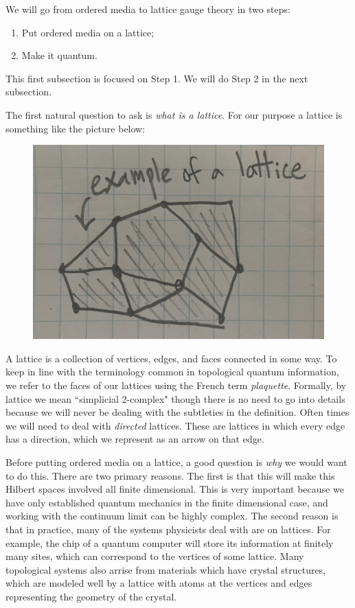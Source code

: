 \documentclass{article}
\theoremstyle{definition}
\numberwithin{figure}{section}
\begin{document}
We will go from ordered media to lattice gauge theory in two steps:

\begin{enumerate}[Step 1:]
\item Put ordered media on a lattice;
\item Make it quantum.
\end{enumerate}

This first subsection is focused on Step 1. We will do Step 2 in the next subsection.

The first natural question to ask is \textit{what is a lattice}. For our purpose a lattice is something like the picture below:

\begin{figure}[h]
\begin{center}
\includegraphics[scale=.04]{lattice-example}
\end{center}
\end{figure}

A lattice is a collection of vertices, edges, and faces connected in some way. To keep in line with the terminology common in topological quantum information, we refer to the faces of our lattices using the French term \textit{plaquette}. Formally, by lattice we mean ``simplicial 2-complex" though there is no need to go into details because we will never be dealing with the subtleties in the definition. Often times we will need to deal with \textit{directed} lattices. These are lattices in which every edge has a direction, which we represent as an arrow on that edge.

Before putting ordered media on a lattice, a good question is \textit{why} we would want to do this. There are two primary reasons. The first is that this will make this Hilbert spaces involved all finite dimensional. This is very important because we have only established quantum mechanics in the finite dimensional case, and working with the continuum limit can be highly complex. The second reason is that in practice, many of the systems physicists deal with are on lattices. For example, the chip of a quantum computer will store its information at finitely many sites, which can correspond to the vertices of some lattice. Many topological systems also arrise from materials which have crystal structures, which are modeled well by a lattice with atoms at the vertices and edges representing the geometry of the crystal.
\end{document}
